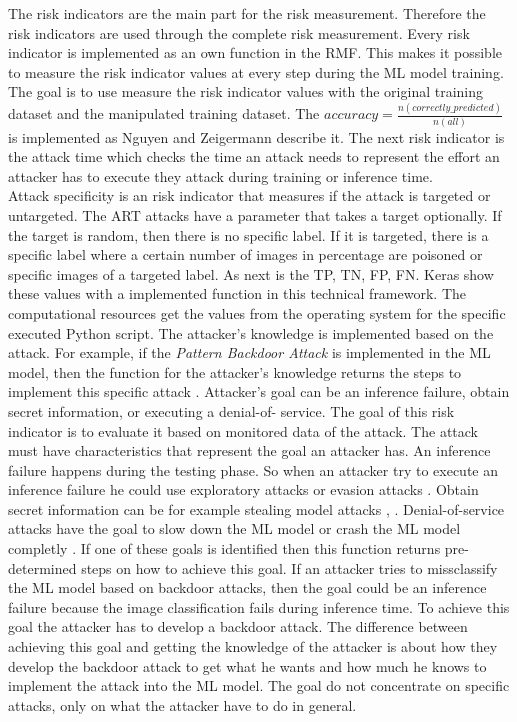 The risk indicators are the main part for the risk measurement. Therefore the risk indicators are used through the complete risk measurement. Every risk indicator is implemented as an own
function in the RMF. This makes it possible to measure the risk indicator values at every step during the ML model training. The goal is to use measure the risk indicator values with the
original training dataset and the manipulated training dataset. The $accuracy=\frac{n(correctly\_predicted)}{n(all)}$ is implemented as Nguyen and Zeigermann \cite{9783960101925} describe it.
The next risk indicator is the attack time which checks the time an attack needs to represent the effort an attacker has to execute they attack during training or inference time. \\
Attack specificity is an risk indicator that measures if the attack is targeted or untargeted. The ART attacks have a parameter that takes a target optionally. If the target is random, then there is no specific label. If it is targeted, there is a specific label where a certain number of images in percentage are poisoned or specific images of a targeted label. As next is the TP, TN, FP, FN. Keras show these values with a
implemented function in this technical framework. The computational resources get the values from the operating system for the specific executed Python script. The attacker's knowledge is
implemented based on the attack. For example, if the \textit{Pattern Backdoor Attack} is implemented in the ML model, then the function for the attacker's knowledge returns the steps to
implement this specific attack \cite{bsi_2013}. Attacker's goal \cite{DBLP:journals/corr/abs-2012-04884} can be an inference failure, obtain secret information, or executing a denial-of-
service. The goal of this risk indicator is to evaluate it based on monitored data of the attack. The attack must have characteristics that represent the goal an attacker has. An
inference failure happens during the testing phase. So when an attacker try to execute an inference failure he could use exploratory attacks \cite{tabassi2019taxonomy} or evasion attacks \cite{DBLP:conf/sp/Carlini017}. Obtain secret information can be for example stealing model attacks \cite{DBLP:journals/corr/abs-2105-00623}, \cite{DBLP:journals/wicomm/ZhangLGQTZ20}. Denial-of-service attacks have the goal to slow
down the ML model or crash the ML model completly \cite{DBLP:journals/sensors/VaccariAC20}. If one of these goals is identified then this function returns pre-determined steps on how to achieve this goal. If an attacker tries to missclassify the ML model based on backdoor attacks, then the goal could be an inference failure because the image classification fails during inference time. To achieve this goal the attacker has to develop a backdoor attack. The difference between achieving this goal and getting the knowledge of the attacker is about how they develop the backdoor attack to get what he wants and how much he knows to implement the attack into the ML model. The goal do not concentrate on specific attacks, only on what the attacker have to do in general. \\
